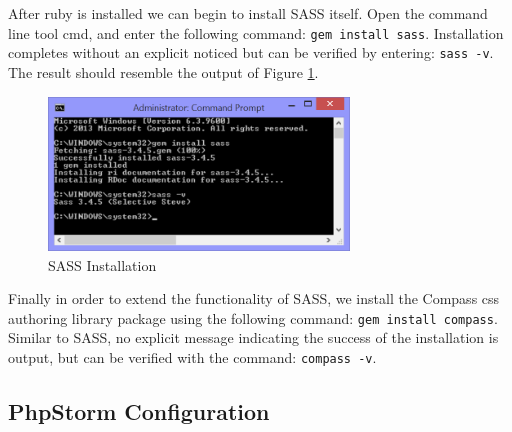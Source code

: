 \documentclass[]{report}
\begin{document}
\noindent
After ruby is installed we can begin to install SASS itself. Open the command line tool cmd, and enter the following command: \texttt{gem install sass}. Installation completes without an explicit noticed but can be verified by entering: \texttt{sass -v}. The result should resemble the output of Figure \ref{fig:sassinstallation}.\\

\begin{figure}[h] 
  \centering
  \includegraphics[width=8cm]{sassinstallation.png}
  \caption{SASS Installation}
  \label{fig:sassinstallation}
\end{figure}

\noindent
Finally in order to extend the functionality of SASS, we install the Compass css authoring library package using the following command: \texttt{gem install compass}. Similar to SASS, no explicit message indicating the success of the installation is output, but can be verified with the command: \texttt{compass -v}.

\subsection{PhpStorm Configuration}
\end{document}
